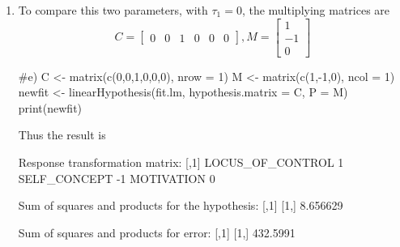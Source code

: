 \documentclass{article}
\begin{document}
\begin{enumerate}[leftmargin = 0 em, label = \arabic*., font = \bfseries]
\begin{enumerate}
\begin{rcode}
fit.lm.P12 <- lm(cbind(LOCUS_OF_CONTROL,SELF_CONCEPT,MOTIVATION) ~ READ + WRITE + SCIENCE + PROG, data = psych[psych$PROG %
fit.lm.P12_reduced <- lm(cbind(LOCUS_OF_CONTROL,SELF_CONCEPT,MOTIVATION) ~ READ + WRITE + SCIENCE, data = psych[psych$PROG %
test_P12 <- anova(fit.lm.P12, fit.lm.P12_reduced, test = "Wilks")
p_vals[1] <- test_P12$`Pr(>F)`[2]

fit.lm.P23 <- lm(cbind(LOCUS_OF_CONTROL,SELF_CONCEPT,MOTIVATION) ~ READ + WRITE + SCIENCE + PROG, data = psych[psych$PROG %
fit.lm.P23_reduced <- lm(cbind(LOCUS_OF_CONTROL,SELF_CONCEPT,MOTIVATION) ~ READ + WRITE + SCIENCE, data = psych[psych$PROG %
test_P23 <- anova(fit.lm.P23, fit.lm.P23_reduced, test = "Wilks")
p_values[2] <- test_P23$`Pr(>F)`[2]

bon_adj<-p.adjust(p_values,method="bonferroni")
bon_adj
fdr_adj<-p.adjust(p_values,method="fdr")
fdr_adj
\end{rcode}

The adjusted pvalues are
\begin{rcode}
# Bonferroni
0.000000000 0.001529967

# FDR
0.0000000000 0.0007649833
\end{rcode}

Both adjusted p-values are small, so the profiles between Program 1 and 2 and between Program 2 and 3 are different.

\item 
To compare this two parameters, with $\tau_1 = 0$, the multiplying matrices are
\[C = \begin{bmatrix}
	0 & 0  & 1 & 0 & 0 &0
\end{bmatrix}, M = \begin{bmatrix}
	1 \\
	-1\\
	0
\end{bmatrix}\]
\begin{rcode}
#e)
C <- matrix(c(0,0,1,0,0,0), nrow = 1)
M <- matrix(c(1,-1,0), ncol = 1)
newfit <- linearHypothesis(fit.lm, hypothesis.matrix = C, P = M)
print(newfit)
\end{rcode}
Thus the result is
\begin{rcode}
 Response transformation matrix:
                 [,1]
LOCUS_OF_CONTROL    1
SELF_CONCEPT       -1
MOTIVATION          0

Sum of squares and products for the hypothesis:
         [,1]
[1,] 8.656629

Sum of squares and products for error:
         [,1]
[1,] 432.5991


\end{rcode}
\end{enumerate}
\end{enumerate}
\end{document}
